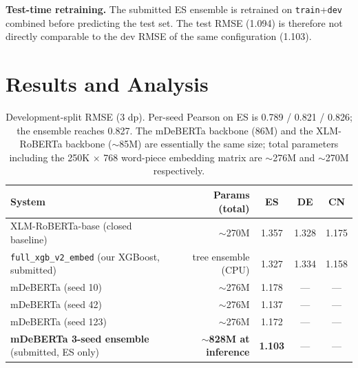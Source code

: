 \documentclass[11pt]{article}
\begin{document}
\textbf{Test-time retraining.} The submitted ES ensemble is retrained on \texttt{train}+\texttt{dev} combined before predicting the test set. The test RMSE (1.094) is therefore not directly comparable to the dev RMSE of the same configuration (1.103).


\section{Results and Analysis}
\label{sec:results}

\begin{table}[t!]
\centering
\small
\begin{tabular}{lrccc}
\toprule
\textbf{System} & \textbf{Params (total)} & \textbf{ES} & \textbf{DE} & \textbf{CN} \\
\midrule
XLM-RoBERTa-base (closed baseline) & $\sim$270M & 1.357 & 1.328 & 1.175 \\
\texttt{full\_xgb\_v2\_embed} (our XGBoost, submitted) & tree ensemble (CPU)\footnotemark & 1.327 & 1.334 & 1.158 \\
\addlinespace
mDeBERTa (seed 10) & $\sim$276M & 1.178 & --- & --- \\
mDeBERTa (seed 42) & $\sim$276M & 1.137 & --- & --- \\
mDeBERTa (seed 123) & $\sim$276M & 1.172 & --- & --- \\
\textbf{mDeBERTa 3-seed ensemble} (submitted, ES only) & \textbf{$\sim$828M at inference} & \textbf{1.103} & --- & --- \\
\bottomrule
\end{tabular}
\caption{Development-split RMSE (3 dp). Per-seed Pearson on ES is 0.789 / 0.821 / 0.826; the ensemble reaches 0.827. The mDeBERTa backbone (86M) and the XLM-RoBERTa backbone ($\sim$85M) are essentially the same size; total parameters including the 250K $\times$ 768 word-piece embedding matrix are $\sim$276M and $\sim$270M respectively.}
\label{tab:dev_main}
\end{table}
\end{document}
